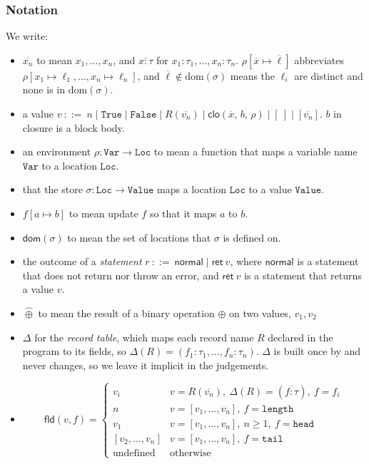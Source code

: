 \documentclass[11pt,a4paper]{article}
\newcommand{\kw}[1]{\mathtt{#1}}                     %
\newcommand{\clo}[3]{\mathsf{clo}(#1,\, #2,\, #3)}
\newcommand{\rn}[1]{\TirNameStyle{#1}}
\begin{document}
\subsubsection{Notation}
 We write:
 \begin{itemize}
 	\item $\overline{x_n}$ to mean $x_1, \dots, x_n$, and $\overline{x : \tau}$ for
 	$x_1 : \tau_1, \ldots, x_n : \tau_n$. $\rho[\overline{x} \mapsto \overline{\ell}]$ abbreviates
 	$\rho[x_1 \mapsto \ell_1, \ldots, x_n \mapsto \ell_n]$, and $\overline{\ell} \notin \mathrm{dom}(\sigma)$
 	means the $\ell_i$ are distinct and none is in $\mathrm{dom}(\sigma)$.
 	\item a value $v\ ::=\ n\mid \kw{True} \mid \kw{False}\mid R(\overline{v_n})\mid \clo{\overline{x}}{b}{\rho}\mid[\ ]\mid[\overline{v_n}]$. $b$ in closure is a block body.
 	\item an environment $\rho : \kw{Var} \to \kw{Loc}$ to mean a function that maps a variable name $\kw{Var}$ to a location $\kw{Loc}$.
 	\item that the store $\sigma : \kw{Loc} \to \kw{Value}$ maps a location $\kw{Loc}$ to a value $\kw{Value}$.
 	\item $f[a\mapsto b]$ to mean update $f$ so that it maps $a$ to $b$.
 	\item $\mathsf{dom}(\sigma)$ to mean the set of locations that $\sigma$ is defined on.
	\item the outcome of a \textit{statement} $r\ ::=\ \mathsf{normal}\mid \mathsf{ret}\ v$, where $\mathsf{normal}$ is a statement that does not return nor throw an error, and $\mathsf{ret}\ v$ is a statement that returns a value $v$.
	\item $\mathsf{\hat{\oplus}}$ to mean the result of a binary operation $\oplus$ on two values, $v_1, v_2$
	\item $\Delta$ for the \textit{record table}, which maps each record name $R$ declared in the program to its fields, so $\Delta(R) = (f_1 : \tau_1, \ldots, f_n : \tau_n)$. $\Delta$ is built once by \rn{P-PROG} and never changes, so we leave it implicit in the judgements.
	\item
	\[
	\mathsf{fld}(v, f) =
	\begin{cases}
		v_i                 & v = R(\overline{v_n}),\ \Delta(R) = (\overline{f{:}\tau}),\ f = f_i \\
		n                   & v = [v_1, \dots, v_n],\ f = \kw{length} \\
		v_1                 & v = [v_1, \dots, v_n],\ n \ge 1,\ f = \kw{head} \\
		{[v_2, \dots, v_n]} & v = [v_1, \dots, v_n],\ f = \kw{tail} \\
		\text{undefined}    & \text{otherwise}
	\end{cases}
	\]
	
 \end{itemize}
\end{document}
